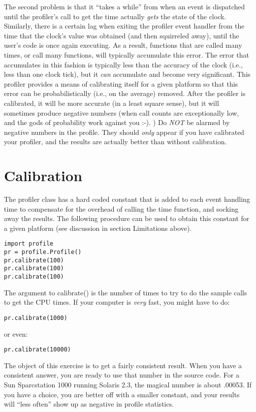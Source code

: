 The second problem is that it ``takes a while'' from when an event is
dispatched until the profiler's call to get the time actually
\emph{gets} the state of the clock.  Similarly, there is a certain lag
when exiting the profiler event handler from the time that the clock's
value was obtained (and then squirreled away), until the user's code
is once again executing.  As a result, functions that are called many
times, or call many functions, will typically accumulate this error.
The error that accumulates in this fashion is typically less than the
accuracy of the clock (i.e., less than one clock tick), but it
\emph{can} accumulate and become very significant.  This profiler
provides a means of calibrating itself for a given platform so that
this error can be probabilistically (i.e., on the average) removed.
After the profiler is calibrated, it will be more accurate (in a least
square sense), but it will sometimes produce negative numbers (when
call counts are exceptionally low, and the gods of probability work
against you :-). )  Do \emph{NOT} be alarmed by negative numbers in
the profile.  They should \emph{only} appear if you have calibrated
your profiler, and the results are actually better than without
calibration.


\section{Calibration}

The profiler class has a hard coded constant that is added to each
event handling time to compensate for the overhead of calling the time
function, and socking away the results.  The following procedure can
be used to obtain this constant for a given platform (see discussion
in section Limitations above).

\bcode\begin{verbatim}
import profile
pr = profile.Profile()
pr.calibrate(100)
pr.calibrate(100)
pr.calibrate(100)
\end{verbatim}\ecode
%
The argument to calibrate() is the number of times to try to do the
sample calls to get the CPU times.  If your computer is \emph{very}
fast, you might have to do:

\bcode\begin{verbatim}
pr.calibrate(1000)
\end{verbatim}\ecode
%
or even:

\bcode\begin{verbatim}
pr.calibrate(10000)
\end{verbatim}\ecode
%
The object of this exercise is to get a fairly consistent result.
When you have a consistent answer, you are ready to use that number in
the source code.  For a Sun Sparcstation 1000 running Solaris 2.3, the
magical number is about .00053.  If you have a choice, you are better
off with a smaller constant, and your results will ``less often'' show
up as negative in profile statistics.

